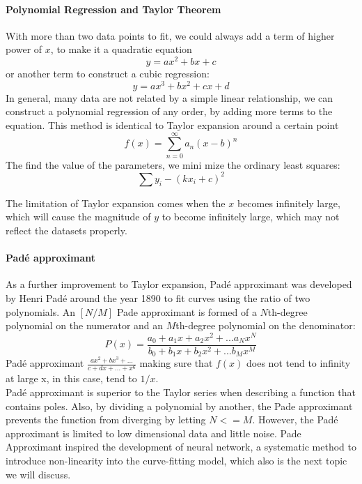 \documentclass[aps,prb,twocolumn,superscriptaddress,floatfix]{revtex4-2}
\newcounter{para}
\begin{document}
\paragraph{Polynomial Regression and Taylor Theorem}
With more than two data points to fit,  we could always add a term of higher power of $x$, to make it a quadratic equation
\begin{equation}
    y= ax^2 +bx+ c
\end{equation}
or another term to construct a cubic regression:
\begin{equation}
    y= ax^3 +bx^2 + cx+d
\end{equation}
In general, many data are not related by a simple linear relationship, we can construct a polynomial regression of any order, by adding more terms to the equation.
This method is identical to Taylor expansion around a certain point 
$$f(x)=\sum_{n=0}^{\infty} a_n(x-b)^n$$
The find the value of the parameters, we mini
mize the ordinary least squares:
\begin{equation}
    \sum{y_i-(kx_i+c)}^2
\end{equation}

The limitation of Taylor expansion comes when the $x$ becomes infinitely large, which will cause the magnitude of $y$ to become infinitely large, which may not reflect the datasets properly. \\

\paragraph{Padé approximant}
As a further improvement to Taylor expansion, Padé approximant was developed by Henri Padé around the year 1890 to fit curves using the ratio of two polynomials\cite{wikipediaPadApproximant}.
An $[N/M]$ Pade approximant is formed of a $N$th-degree polynomial on the numerator and an $M$th-degree polynomial on the denominator:
\begin{equation}
    P(x)=\frac{a_0+a_1 x+a_2x^2+... a_Nx^N}{b_0+b_1 x+b_2x^2+... b_Mx^M}
\end{equation}
\cite{wolframPadApproximant}
Padé approximant $\frac{ax^2+bx^3+...}{c+dx+...+x^6}$ making sure that $f(x)$ does not tend to infinity at large x, in this case, tend to $1/x$.\\
Padé approximant is superior to the Taylor series when describing a function that contains poles. Also, by dividing a polynomial by another, the Pade approximant prevents the function from diverging by letting $N<=M$. However, the Padé approximant is limited to low dimensional data and little noise\cite{deringer2021gaussian}. 
Pade Approximant inspired the development of neural network\cite{TaylorSeries}, a systematic method to introduce non-linearity into the curve-fitting model, which also is the next topic we will discuss.\\
\end{document}
